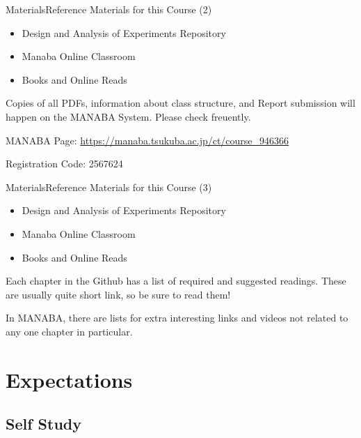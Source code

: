 \documentclass[t]{beamer}
\begin{document}
\begin{ftst}
  {Materials}{Reference Materials for this Course (2)}
  \begin{itemize}
  \item Design and Analysis of Experiments Repository
  \item \alert{Manaba Online Classroom}
  \item Books and Online Reads
  \end{itemize}

  \begin{block}{}
    Copies of all PDFs, information about class structure, and Report
    submission will happen on the MANABA System. Please check
    freuently.

    \vone

    MANABA Page: \url{https://manaba.tsukuba.ac.jp/ct/course_946366}

    \vone
    
    Registration Code: \alert{2567624}
    
  \end{block}
\end{ftst}

\begin{ftst}
  {Materials}{Reference Materials for this Course (3)}
  \begin{itemize}
  \item Design and Analysis of Experiments Repository
  \item Manaba Online Classroom
  \item \alert{Books and Online Reads}
  \end{itemize}

  \begin{block}{}
    Each chapter in the Github has a list of required and suggested
    readings. These are usually quite short link, so be sure to read them!

    \vone
    
    In MANABA, there are lists for extra interesting links and videos
    not related to any one chapter in particular.
  \end{block}
\end{ftst}

\section{Expectations}
\subsection{Self Study}
\end{document}

